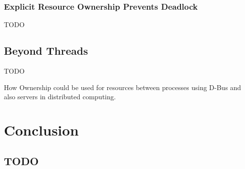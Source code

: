\documentclass[onehalf,11pt]{beavtex}
\begin{document}
\subsection{Explicit Resource Ownership Prevents Deadlock}
TODO

\section{Beyond Threads}

TODO

How Ownership could be used for resources between processes using D-Bus and also
servers in distributed computing.

\chapter{Conclusion}
\section{TODO}


{}

\end{document}
